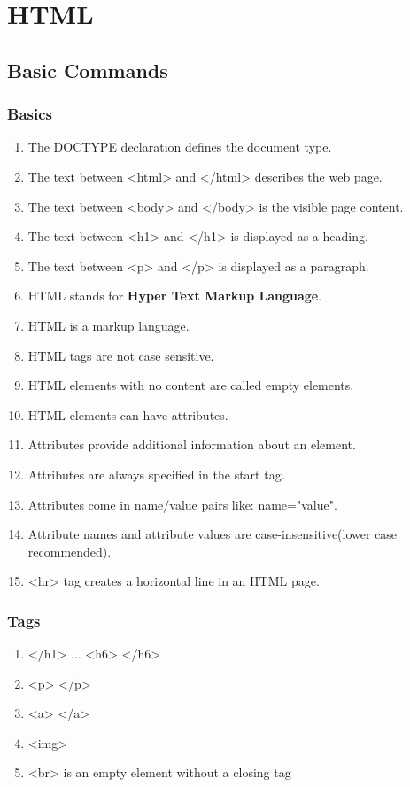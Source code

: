 \documentclass[a4paper,oneside]{book}
\begin{document}
\part{HTML}
\chapter{Basic Commands}
\section{Basics}
\begin{enumerate}
\item The DOCTYPE declaration defines the document type.
\item The text between <html> and </html> describes the web page.
\item The text between <body> and </body> is the visible page content.
\item The text between <h1> and </h1> is displayed as a heading.
\item The text between <p> and </p> is displayed as a paragraph.
\item HTML stands for \textbf{Hyper Text Markup Language}.
\item HTML is a markup language.
\item HTML tags are not case sensitive.
\item HTML elements with no content are called empty elements.
\item HTML elements can have attributes.
\item Attributes provide additional information about an element.
\item Attributes are always specified in the start tag.
\item Attributes come in name/value pairs like: name="value".
\item Attribute names and attribute values are case-insensitive(lower case recommended).
\item <hr> tag creates a horizontal line in an HTML page.
\end{enumerate}
\section{Tags}
\begin{enumerate}
\item <h1> </h1> ... <h6> </h6>
\item <p> </p>
\item <a> </a>
\item <img>
\item <br> is an empty element without a closing tag
\end{enumerate}
\end{document}

